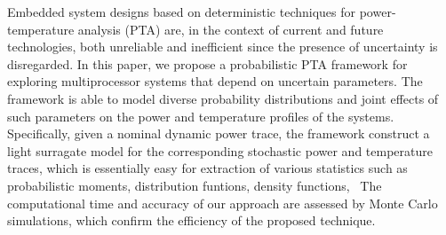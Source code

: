Embedded system designs based on deterministic techniques for power-temperature analysis (PTA) are, in the context of current and future technologies, both unreliable and inefficient since the presence of uncertainty is disregarded. In this paper, we propose a probabilistic PTA framework for exploring multiprocessor systems that depend on uncertain parameters. The framework is able to model diverse probability distributions and joint effects of such parameters on the power and temperature profiles of the systems. Specifically, given a nominal dynamic power trace, the framework construct a light surragate model for the corresponding stochastic power and temperature traces, which is essentially easy for extraction of various statistics such as probabilistic moments, distribution funtions, density functions, \etc\ The computational time and accuracy of our approach are assessed by Monte Carlo simulations, which confirm the efficiency of the proposed technique.
